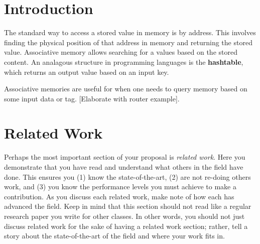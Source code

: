 \documentclass{sig-alternate}
\begin{document}
\section{Introduction}
\label{sec:intro}

The standard way to access a stored value in memory is by address. 
This involves finding the physical position of that address in memory
and returning the stored value. Associative memory allows
searching for a values based on the stored content. An analagous structure
in programming languages is the \textbf{hashtable}, which returns an output value
based on an input key. 

Associative memories are useful for when one needs to query memory based 
on some input data or tag. [Elaborate with router example]. 
%

\section{Related Work}
\label{sec:related_work}
Perhaps the most important section of your proposal is \textit{related
  work}. Here you demonstrate that you have read and understand what
others in the field have done. This ensures you (1) know the
state-of-the-art, (2) are not re-doing others work, and (3) you know
the performance levels you must achieve to make a contribution. As you
discuss each related work, make note of how each has advanced the
field. Keep in mind that this section should not read like a regular
research paper you write for other classes. In other words, you should
not just discuss related work for the sake of having a related work
section; rather, tell a story about the state-of-the-art of the field
and where your work fits in.
\end{document}
